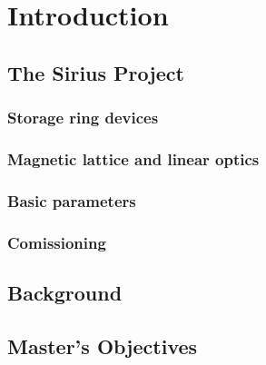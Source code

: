 \chapter{Introduction} \label{chap:intro}

\section{The Sirius Project}

\subsection{Storage ring devices}

\subsection{Magnetic lattice and linear optics}

\subsection{Basic parameters}

\subsection{Comissioning}

\section{Background}

\section{Master's Objectives}






